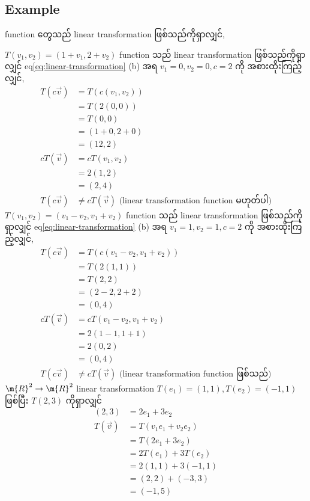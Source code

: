 \subsection{Example}
function တွေသည် linear transformation ဖြစ်သည်ကိုရှာလျှင်,

$T(v_1,v_2)=(1+v_1,2+v_2)$ function သည် linear transformation ဖြစ်သည်ကိုရှာလျှင် eq\ref{eq:linear-transformation} (b) အရ $v_1=0,v_2=0,c=2$ ကို အစားထိုးကြည့်လျှင်,
\[
    \begin{split}
        T(c\vec{v})&=T(c(v_1,v_2)) \\
        &=T(2(0,0)) \\
        &=T(0,0) \\
        &=(1+0,2+0) \\
        &=(12,2) \\
        cT(\vec{v})&=cT(v_1,v_2) \\
        &=2(1,2) \\
        &=(2,4) \\
        T(c\vec{v})&\ne cT(\vec{v}) \text{ (linear transformation function မဟုတ်ပါ)}
    \end{split}
\]
$T(v_1,v_2)=(v_1-v_2,v_1+v_2)$ function သည် linear transformation ဖြစ်သည်ကိုရှာလျှင် eq\ref{eq:linear-transformation} (b) အရ $v_1=1,v_2=1,c=2$ ကို အစားထိုးကြည့်လျှင်,
\[
    \begin{split}
        T(c\vec{v})&=T(c(v_1-v_2,v_1+v_2)) \\
        &=T(2(1,1)) \\
        &=T(2,2) \\
        &=(2-2,2+2) \\
        &=(0,4) \\
        cT(\vec{v})&=cT(v_1-v_2,v_1+v_2) \\
        &=2(1-1,1+1) \\
        &=2(0,2) \\
        &=(0,4) \\
        T(c\vec{v})&\ne cT(\vec{v}) \text{ (linear transformation function ဖြစ်သည်)}
    \end{split}
\]
$\m{R}^2 \rightarrow\m{R}^2$ linear transformation $T(e_1)=(1,1),T(e_2)=(-1,1)$ ဖြစ်ပြီး $T(2,3)$ ကိုရှာလျှင်
\[
    \begin{split}
        (2,3)&=2e_1+3e_2 \\
        T(\vec{v})&=T(v_1e_1+v_2e_2) \\
        &=T(2e_1+3e_2) \\
        &=2T(e_1)+3T(e_2) \\
        &=2(1,1)+3(-1,1) \\
        &=(2,2)+(-3,3) \\
        &=(-1,5)
    \end{split}
\]